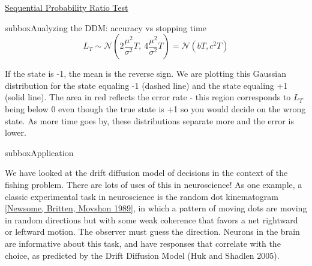 \begin{textbox}{\href{https://compneuro.neuromatch.io/tutorials/W3D2_HiddenDynamics/student/W3D2_Tutorial1.html}{Sequential Probability Ratio Test }   }
\begin{subbox}{subbox}{Analyzing the DDM: accuracy vs stopping time}
\begin{equation}
L_T\sim\mathcal{N}\left(2\frac{\mu^2}{\sigma^2}T,\ 4\frac{\mu^2}{\sigma^2}T\right)=\mathcal{N}(bT,c^2T)
\end{equation}

If the state is -1, the mean is the reverse sign. We are plotting this Gaussian distribution for the state equaling -1 (dashed line) and the state equaling +1 (solid line). The area in red reflects the error rate - this region corresponds to $L_T$ being below 0 even though the true state is +1 so you would decide on the wrong state. As more time goes by, these distributions separate more and the error is lower.

\end{subbox}
\begin{subbox}{subbox}{Application}
\scriptsize


We have looked at the drift diffusion model of decisions in the context of the fishing problem. There are lots of uses of this in neuroscience! As one example, a classic experimental task in neuroscience is the random dot kinematogram \href{https://www.nature.com/articles/341052a0.pdf}{[Newsome, Britten, Movshon 1989]}, in which a pattern of moving dots are moving in random directions but with some weak coherence that favors a net rightward or leftward motion. The observer must guess the direction. Neurons in the brain are informative about this task, and have responses that correlate with the choice, as predicted by the Drift Diffusion Model (Huk and Shadlen 2005).

\end{subbox}
\end{textbox}
\newpage
